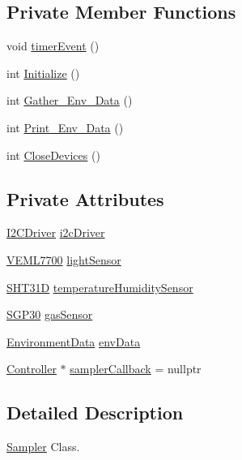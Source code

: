 \subsection*{Private Member Functions}
\begin{DoxyCompactItemize}
\item 
void \hyperlink{classSampler_addf333c6e247ee3a1def41260caa902a}{timer\+Event} ()
\item 
int \hyperlink{classSampler_a1aed5b32bf99312ba38d092f1acad3d9}{Initialize} ()
\item 
int \hyperlink{classSampler_a5702d0ef89adb532fef4f9879e7e36d4}{Gather\+\_\+\+Env\+\_\+\+Data} ()
\item 
int \hyperlink{classSampler_acf3d04a740356e54fe53766a7f00ae15}{Print\+\_\+\+Env\+\_\+\+Data} ()
\item 
int \hyperlink{classSampler_a24077f1eeb2491b65f9577efd07dffd6}{Close\+Devices} ()
\end{DoxyCompactItemize}
\subsection*{Private Attributes}
\begin{DoxyCompactItemize}
\item 
\hyperlink{classI2CDriver}{I2\+C\+Driver} \hyperlink{classSampler_ada5598060be79a005bf4375fcbf9773d}{i2c\+Driver}
\item 
\hyperlink{classVEML7700}{V\+E\+M\+L7700} \hyperlink{classSampler_ae81394f464670af514f8dc7c5df46d74}{light\+Sensor}
\item 
\hyperlink{classSHT31D}{S\+H\+T31D} \hyperlink{classSampler_aad073931f59004109e8050c669b294c0}{temperature\+Humidity\+Sensor}
\item 
\hyperlink{classSGP30}{S\+G\+P30} \hyperlink{classSampler_a4af78e46617fc8cdbc4bd14a7db5c741}{gas\+Sensor}
\item 
\hyperlink{structEnvironmentData}{Environment\+Data} \hyperlink{classSampler_a4cfbeb66e1cd18cfc66ccdb2712770f9}{env\+Data}
\item 
\hyperlink{classController}{Controller} $\ast$ \hyperlink{classSampler_a3a37b5d667134d905e4bda45974cb936}{sampler\+Callback} = nullptr
\end{DoxyCompactItemize}


\subsection{Detailed Description}
\hyperlink{classSampler}{Sampler} Class. 

